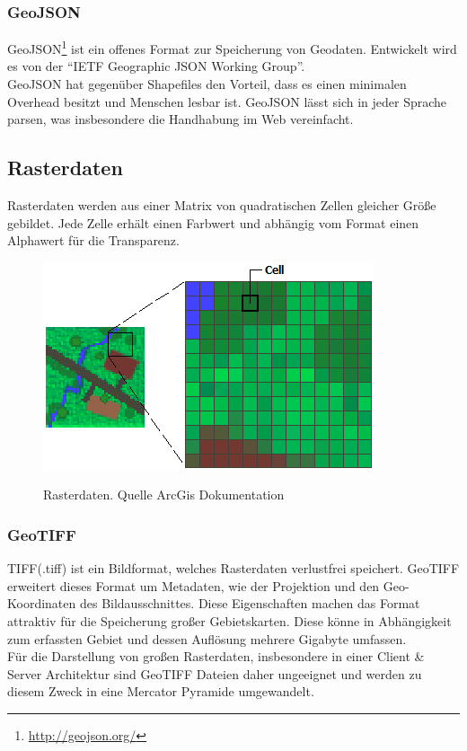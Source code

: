 \documentclass[10pt,conference,compsocconf]{IEEEtran}
\begin{document}
\subsubsection{GeoJSON}
GeoJSON\footnote{\url{http://geojson.org/}} ist ein offenes Format zur Speicherung von Geodaten. Entwickelt wird es von der \enquote{IETF Geographic JSON Working Group}. \\
GeoJSON hat gegenüber Shapefiles den Vorteil, dass es einen minimalen Overhead besitzt und Menschen lesbar ist. GeoJSON lässt sich in jeder Sprache parsen, was insbesondere die Handhabung im Web vereinfacht.


\subsection{Rasterdaten}
Rasterdaten werden aus einer Matrix von quadratischen Zellen gleicher Größe gebildet. Jede Zelle erhält einen Farbwert und abhängig vom Format einen Alphawert für die Transparenz. \\
\begin{figure}[H]
	\centering
	\includegraphics[width=0.75\columnwidth]{img/rasterdaten}\\
	\caption[]{Rasterdaten. Quelle ArcGis Dokumentation\footnotemark}
	\label{img:rasterdaten}
\end{figure}

\subsubsection{GeoTIFF}
TIFF(.tiff) ist ein Bildformat, welches Rasterdaten verlustfrei speichert. GeoTIFF erweitert dieses Format um Metadaten, wie der Projektion und den Geo-Koordinaten des Bildausschnittes. Diese Eigenschaften machen das Format attraktiv für die Speicherung großer Gebietskarten. Diese könne in Abhängigkeit zum erfassten Gebiet und dessen Auflösung mehrere Gigabyte umfassen. \\
Für die Darstellung von großen Rasterdaten, insbesondere in einer Client \& Server Architektur sind GeoTIFF Dateien daher ungeeignet und werden zu diesem Zweck in eine Mercator Pyramide umgewandelt.
\end{document}
